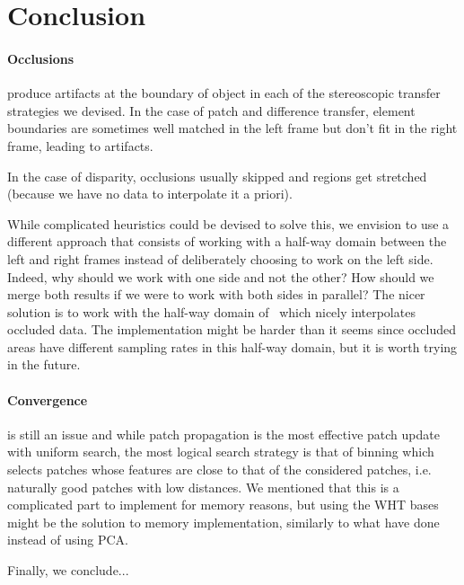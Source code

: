 

\section{Conclusion}


\paragraph{Occlusions} produce artifacts at the boundary of object in each of the stereoscopic transfer strategies we devised.
In the case of patch and difference transfer, element boundaries are sometimes well matched in the left frame but don't fit in the right frame, leading to artifacts.


In the case of disparity, occlusions usually skipped and regions get stretched (because we have no data to interpolate it a priori).


While complicated heuristics could be devised to solve this, we envision to use a different approach that consists of working with a half-way domain between the left and right frames instead of deliberately choosing to work on the left side.
Indeed, why should we work with one side and not the other? How should we merge both results if we were to work with both sides in parallel?
The nicer solution is to work with the half-way domain of~\cite{} which nicely interpolates occluded data.
The implementation might be harder than it seems since occluded areas have different sampling rates in this half-way domain, but it is worth trying in the future.

\paragraph{Convergence} is still an issue and while patch propagation is the most effective patch update with uniform search, the most logical search strategy is that of binning which selects patches whose features are close to that of the considered patches, i.e. naturally good patches with low distances.
We mentioned that this is a complicated part to implement for memory reasons, but using the WHT bases might be the solution to memory implementation, similarly to what \cite{He12} have done instead of using PCA.

Finally, we conclude...
